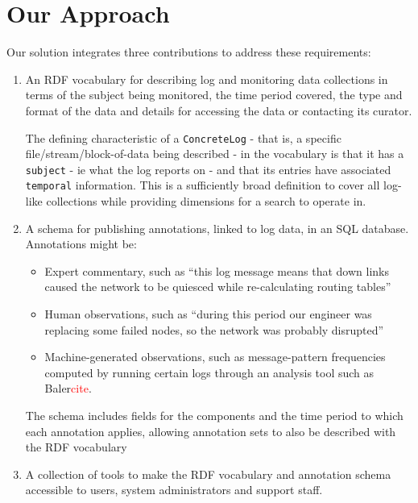 \section{Our Approach}
\label{s:solution}

Our solution integrates three contributions to address these requirements:
\begin{enumerate}
\item An RDF vocabulary for describing log and monitoring data collections
      in terms of the subject being monitored, the time period covered,
      the type and format of the data and details for accessing the data or
      contacting its curator.
      
      The defining characteristic of a \texttt{ConcreteLog} - that is, a 
      specific file/stream/block-of-data being described - in the vocabulary
      is that it has a \texttt{subject} - ie what the log reports on - and 
      that its entries have associated \texttt{temporal} information. This is a 
      sufficiently broad definition to cover all log-like collections
      while providing dimensions for a search to operate in.
      
\item A schema for publishing annotations, linked to log data, in an SQL
	  database. Annotations might be:
      
\begin{itemize}
\item Expert commentary, such as ``this log message means that down links
      caused the network to be quiesced while re-calculating routing tables''      
\item Human observations, such as ``during this period our engineer was 
      replacing some failed nodes, so the network was probably disrupted'' 
\item Machine-generated observations, such as message-pattern frequencies 
      computed by running certain logs through an analysis tool such as 
      Baler\textcolor{red}{cite}.
\end{itemize}

      The schema includes fields for the  components and the time period to 
      which each annotation applies, allowing annotation sets to also be 
      described with the RDF vocabulary

\item A collection of tools to make the RDF vocabulary and annotation 
      schema accessible to users, system administrators and support staff.


\end{enumerate}
